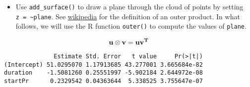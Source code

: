 \documentclass[]{book}
\newenvironment{Shaded}{\begin{snugshade}}{\end{snugshade}}
\newcommand{\KeywordTok}[1]{\textcolor[rgb]{0.13,0.29,0.53}{\textbf{#1}}}
\newcommand{\DataTypeTok}[1]{\textcolor[rgb]{0.13,0.29,0.53}{#1}}
\newcommand{\DecValTok}[1]{\textcolor[rgb]{0.00,0.00,0.81}{#1}}
\newcommand{\FloatTok}[1]{\textcolor[rgb]{0.00,0.00,0.81}{#1}}
\newcommand{\StringTok}[1]{\textcolor[rgb]{0.31,0.60,0.02}{#1}}
\newcommand{\CommentTok}[1]{\textcolor[rgb]{0.56,0.35,0.01}{\textit{#1}}}
\newcommand{\OtherTok}[1]{\textcolor[rgb]{0.56,0.35,0.01}{#1}}
\newcommand{\ControlFlowTok}[1]{\textcolor[rgb]{0.13,0.29,0.53}{\textbf{#1}}}
\newcommand{\OperatorTok}[1]{\textcolor[rgb]{0.81,0.36,0.00}{\textbf{#1}}}
\newcommand{\NormalTok}[1]{#1}
\providecommand{\tightlist}{%
  \setlength{\itemsep}{0pt}\setlength{\parskip}{0pt}}
\begin{document}
\hypertarget{htmlwidget-b1a075f5538d7f834f47}{}

\begin{itemize}
\tightlist
\item
  Use \texttt{add\_surface()} to draw a plane through the cloud of
  points by setting \texttt{z\ =\ \textasciitilde{}plane}. See
  \href{https://en.wikipedia.org/wiki/Outer_product}{wikipedia} for the
  definition of an outer product. In what follows, we will use the R
  function \texttt{outer()} to compute the values of \texttt{plane}.
\end{itemize}

\[\bf{u \otimes v} = \bf{uv^T}\]

\begin{Shaded}
\end{Shaded}

\begin{verbatim}
              Estimate Std. Error   t value     Pr(>|t|)
(Intercept) 51.0295070 1.17913685 43.277001 3.665684e-82
duration    -1.5081260 0.25551997 -5.902184 2.644972e-08
startPr      0.2329542 0.04363644  5.338525 3.755647e-07
\end{verbatim}

\begin{Shaded}
\end{Shaded}
\end{document}
